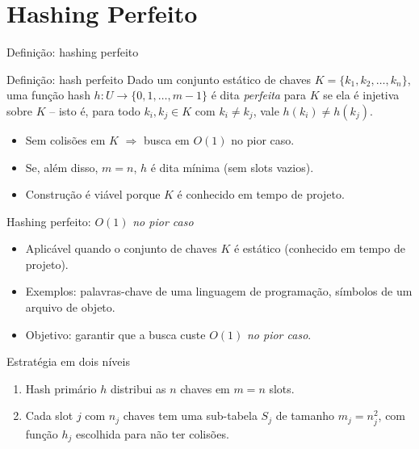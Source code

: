 \documentclass[aspectratio=169]{beamer}
\begin{document}
\section{Hashing Perfeito}

\begin{frame}{Definição: hashing perfeito}
\begin{block}{Definição: hash perfeito}
Dado um conjunto \alert{estático} de chaves $K = \{k_1, k_2, \dots, k_n\}$, uma função hash $h: U \to \{0, 1, \dots, m-1\}$ é dita \emph{perfeita} para $K$ se ela é \alert{injetiva} sobre $K$ -- isto é, para todo $k_i, k_j \in K$ com $k_i \neq k_j$, vale $h(k_i) \neq h(k_j)$.
\end{block}
\begin{itemize}
\item Sem colisões em $K$ $\Rightarrow$ busca em $O(1)$ \alert{no pior caso}.
\item Se, além disso, $m = n$, $h$ é dita \alert{mínima} (sem slots vazios).
\item Construção é viável porque $K$ é conhecido em tempo de projeto.
\end{itemize}
\end{frame}

\begin{frame}{Hashing perfeito: $O(1)$ \emph{no pior caso}}
\begin{itemize}
\item Aplicável quando o conjunto de chaves $K$ é \alert{estático} (conhecido em tempo de projeto).
\item Exemplos: palavras-chave de uma linguagem de programação, símbolos de um arquivo de objeto.
\item Objetivo: garantir que a busca custe $O(1)$ \emph{no pior caso}.
\end{itemize}
\begin{block}{Estratégia em dois níveis}
\begin{enumerate}
\item Hash primário $h$ distribui as $n$ chaves em $m = n$ slots.
\item Cada slot $j$ com $n_j$ chaves tem uma sub-tabela $S_j$ de tamanho $m_j = n_j^2$, com função $h_j$ escolhida para não ter colisões.
\end{enumerate}
\end{block}
\end{frame}
\end{document}
